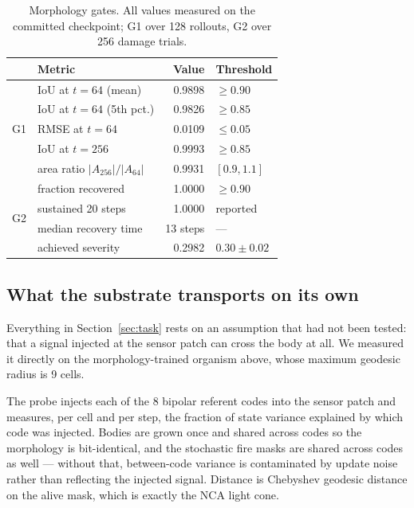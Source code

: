\begin{table}[t]
\centering
\small
\caption{Morphology gates. All values measured on the committed checkpoint;
G1 over 128 rollouts, G2 over 256 damage trials.}
\label{tab:g1g2}
\begin{tabular}{@{}llrl@{}}
\toprule
& \textbf{Metric} & \textbf{Value} & \textbf{Threshold} \\
\midrule
\multirow{5}{*}{G1}
& IoU at $t=64$ (mean)          & 0.9898 & $\geq 0.90$ \\
& IoU at $t=64$ (5th pct.)      & 0.9826 & $\geq 0.85$ \\
& RMSE at $t=64$                & 0.0109 & $\leq 0.05$ \\
& IoU at $t=256$                & 0.9993 & $\geq 0.85$ \\
& area ratio $|A_{256}|/|A_{64}|$ & 0.9931 & $[0.9, 1.1]$ \\
\midrule
\multirow{4}{*}{G2}
& fraction recovered            & 1.0000 & $\geq 0.90$ \\
& sustained 20 steps            & 1.0000 & reported \\
& median recovery time          & 13 steps & --- \\
& achieved severity             & 0.2982 & $0.30 \pm 0.02$ \\
\bottomrule
\end{tabular}
\end{table}

\subsection{What the substrate transports on its own}
\label{sec:results-probe}

Everything in Section~\ref{sec:task} rests on an assumption that had not been
tested: that a signal injected at the sensor patch can cross the body at all. We
measured it directly on the morphology-trained organism above, whose maximum
geodesic radius is 9 cells.

The probe injects each of the 8 bipolar referent codes into the sensor patch and
measures, per cell and per step, the fraction of state variance explained by
which code was injected. Bodies are grown once and shared across codes so the
morphology is bit-identical, and the stochastic fire masks are shared across
codes as well --- without that, between-code variance is contaminated by update
noise rather than reflecting the injected signal. Distance is Chebyshev geodesic
distance on the alive mask, which is exactly the NCA light cone.

